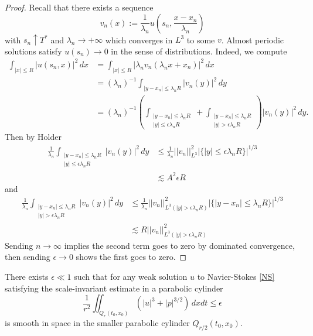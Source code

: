 \begin{proof}
	Recall that there exists a sequence
	\[
		v_n (x) := \frac{1}{\lambda_n} u\left(s_n, \frac{x - x_n}{\lambda_n}\right)
	\]
with $s_n \uparrow T^*$ and $\lambda_n \to + \infty$ which converges in $L^3$ to some $v$. Almost periodic solutions satisfy $u(s_n) \to 0$ in the sense of distributions. Indeed, we compute
	\begin{align*}
		\int_{|x| \leq R} |u(s_n, x)|^2 \, dx 
			&= \int_{|x| \leq R} |\lambda_n v_n (\lambda_n x + x_n)|^2 \, dx \\
			&= (\lambda_n)^{-1} \int_{|y - x_n| \leq \lambda_n R} |v_n(y)|^2 \, dy\\
			&=  (\lambda_n)^{-1} \left(\int_{\substack{|y - x_n| \leq \lambda_n R \\ |y| \leq \epsilon \lambda_n R}} + \int_{\substack{|y - x_n| \leq \lambda_n R \\ |y| > \epsilon \lambda_n R}}\right) |v_n(y)|^2 \, dy . 
	\end{align*}	
Then by Holder
	\begin{align*}
		\frac{1}{\lambda_n}\int_{\substack{|y - x_n| \leq \lambda_n R \\ |y| \leq \epsilon \lambda_n R}}  |v_n(y)|^2 \, dy
			&\leq \frac{1}{\lambda_n} ||v_n||_{L^3}^2 |\{ |y| \leq \epsilon \lambda_n R \}|^{1/3} \\
			&\lesssim A^2 \epsilon R
	\end{align*}
and
	\begin{align*}
		\frac{1}{\lambda_n}\int_{\substack{|y - x_n| \leq \lambda_n R \\ |y| > \epsilon \lambda_n R}}  |v_n(y)|^2 \, dy
			&\leq  \frac{1}{\lambda_n} ||v_n||_{L^3 (|y| > \epsilon \lambda_n R)}^2 |\{|y - x_n| \leq \lambda_n R \}|^{1/3} \\
			&\lesssim R ||v_n||_{L^3 (|y| > \epsilon \lambda_n R)}^2
	\end{align*}
	Sending $n \to \infty$ implies the second term goes to zero by dominated convergence, then sending $\epsilon \to 0$ shows the first goes to zero. 
\end{proof}



\begin{theorem}\label{thm:epsilon}
	There exists $\epsilon \ll 1$ such that for any weak solution $u$ to Navier-Stokes \eqref{NS} satisfying the scale-invariant estimate in a parabolic cylinder
		\[
			\frac{1}{r^2} \iint_{Q_r (t_0, x_0)} (|u|^3 + |p|^{3/2}) \, dx dt \leq \epsilon
		\]
	is smooth in space in the smaller parabolic cylinder $Q_{r/2} (t_0, x_0)$.  
\end{theorem}


